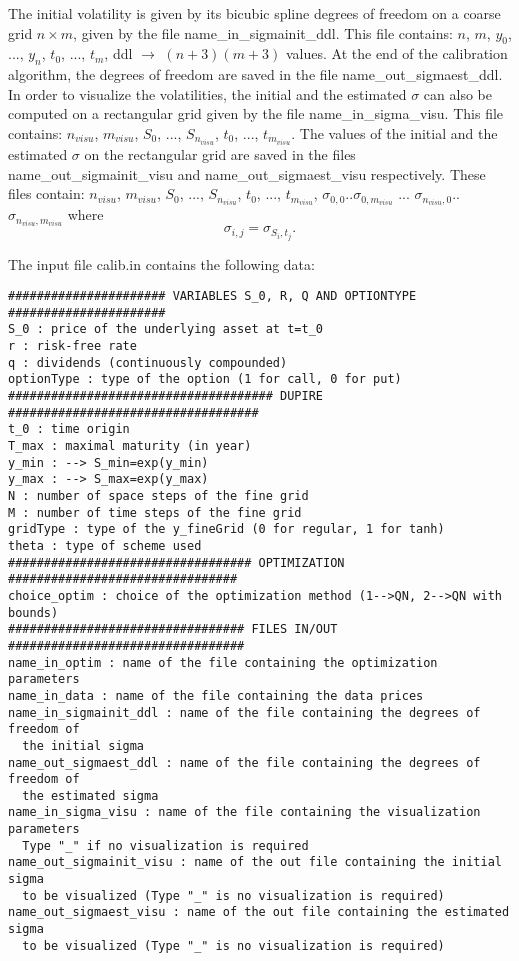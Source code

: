 \documentclass[12pt]{article}
\begin{document}
The initial volatility is given by its bicubic spline degrees of 
freedom on a coarse grid $n \times m$, given by the file 
name\_in\_sigmainit\_ddl. This file contains: 
$n$, $m$, $y_0$, ..., $y_n$, $t_0$, ..., $t_m$, ddl $\rightarrow$ 
$(n+3)(m+3)$ values. At the end of the calibration algorithm, the 
degrees of freedom are saved in the file name\_out\_sigmaest\_ddl. 
In order to visualize the volatilities, the initial and the estimated 
$\sigma$ can also be computed on a rectangular grid given by the file 
name\_in\_sigma\_visu. This file contains: 
$n_{visu}$, $m_{visu}$, $S_0$, ..., $S_{n_{visu}}$, $t_0$, ..., 
$t_{m_{visu}}$. The values of the initial and the estimated $\sigma$ on 
the rectangular grid are saved in the files name\_out\_sigmainit\_visu 
and name\_out\_sigmaest\_visu respectively. These files contain:
$n_{visu}$, $m_{visu}$, $S_0$, ..., $S_{n_{visu}}$, $t_0$, ..., 
$t_{m_{visu}}$, $\sigma_{0,0}$..$\sigma_{0,m_{visu}}$ ... 
$\sigma_{n_{visu},0}$..$\sigma_{n_{visu},m_{visu}}$ where 
$$
\sigma_{i,j} = \sigma_{S_i,t_j}.
$$

The input file calib.in contains the following data:
\begin{verbatim}
###################### VARIABLES S_0, R, Q AND OPTIONTYPE ######################
S_0 : price of the underlying asset at t=t_0
r : risk-free rate     
q : dividends (continuously compounded) 
optionType : type of the option (1 for call, 0 for put)  
##################################### DUPIRE ###################################
t_0 : time origin
T_max : maximal maturity (in year)
y_min : --> S_min=exp(y_min)     
y_max : --> S_max=exp(y_max)
N : number of space steps of the fine grid
M : number of time steps of the fine grid
gridType : type of the y_fineGrid (0 for regular, 1 for tanh)
theta : type of scheme used
################################## OPTIMIZATION ################################
choice_optim : choice of the optimization method (1-->QN, 2-->QN with bounds)
################################# FILES IN/OUT #################################
name_in_optim : name of the file containing the optimization parameters
name_in_data : name of the file containing the data prices
name_in_sigmainit_ddl : name of the file containing the degrees of freedom of
  the initial sigma
name_out_sigmaest_ddl : name of the file containing the degrees of freedom of
  the estimated sigma
name_in_sigma_visu : name of the file containing the visualization parameters
  Type "_" if no visualization is required
name_out_sigmainit_visu : name of the out file containing the initial sigma 
  to be visualized (Type "_" is no visualization is required)
name_out_sigmaest_visu : name of the out file containing the estimated sigma
  to be visualized (Type "_" is no visualization is required)
\end{verbatim}
\end{document}
